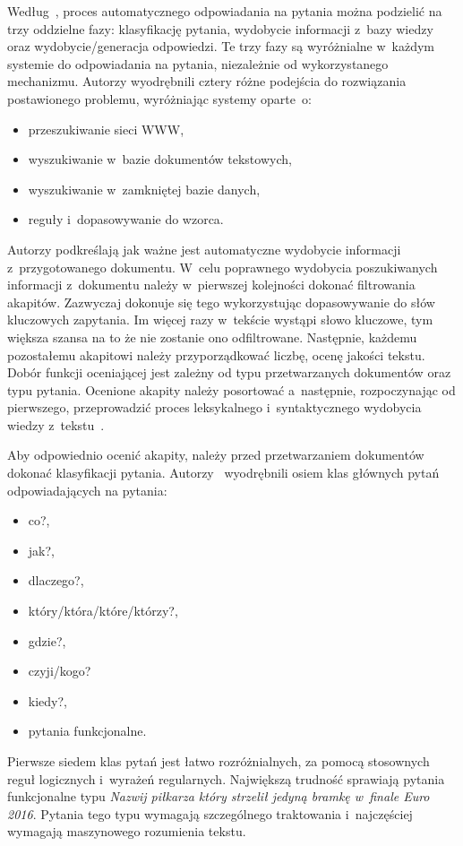 
Według~\cite{gupta2012survey}, proces automatycznego odpowiadania na pytania można podzielić na trzy oddzielne fazy: klasyfikację pytania, wydobycie informacji z~bazy wiedzy oraz wydobycie/generacja odpowiedzi. Te trzy fazy są wyróżnialne w~każdym systemie do odpowiadania na pytania, niezależnie od wykorzystanego mechanizmu. Autorzy wyodrębnili cztery różne podejścia do rozwiązania postawionego problemu, wyróżniając systemy oparte~o:
\begin{itemize}
	\item przeszukiwanie sieci WWW,
	\item wyszukiwanie w~bazie dokumentów tekstowych,
	\item wyszukiwanie w~zamkniętej bazie danych,
	\item reguły i~dopasowywanie do wzorca.
\end{itemize}

Autorzy podkreślają jak ważne jest automatyczne wydobycie informacji z~przygotowanego dokumentu. W~celu poprawnego wydobycia poszukiwanych informacji z~dokumentu należy w~pierwszej kolejności dokonać filtrowania akapitów. Zazwyczaj dokonuje się tego wykorzystując dopasowywanie do słów kluczowych zapytania. Im więcej razy w~tekście wystąpi słowo kluczowe, tym większa szansa na to że nie zostanie ono odfiltrowane. Następnie, każdemu pozostałemu akapitowi należy przyporządkować liczbę, ocenę jakości tekstu.
Dobór funkcji oceniającej jest zależny od typu przetwarzanych dokumentów oraz typu pytania. Ocenione akapity należy posortować a~następnie, rozpoczynając od pierwszego, przeprowadzić proces leksykalnego i~syntaktycznego wydobycia wiedzy z~tekstu~\cite{gupta2012survey}.

Aby odpowiednio ocenić akapity, należy przed przetwarzaniem dokumentów dokonać klasyfikacji pytania. Autorzy~\cite{gupta2012survey} wyodrębnili osiem klas głównych pytań odpowiadających na pytania:
\begin{itemize}
	\item co?,
	\item jak?,
	\item dlaczego?,
	\item który/która/które/którzy?,
	\item gdzie?,
	\item czyji/kogo?
	\item kiedy?,
	\item pytania funkcjonalne.
\end{itemize}

Pierwsze siedem klas pytań jest łatwo rozróżnialnych, za pomocą stosownych reguł logicznych i~wyrażeń regularnych. Największą trudność sprawiają pytania funkcjonalne typu \emph{Nazwij piłkarza który strzelił jedyną bramkę w~finale Euro 2016}. Pytania tego typu wymagają szczególnego traktowania i~najczęściej wymagają maszynowego rozumienia tekstu.